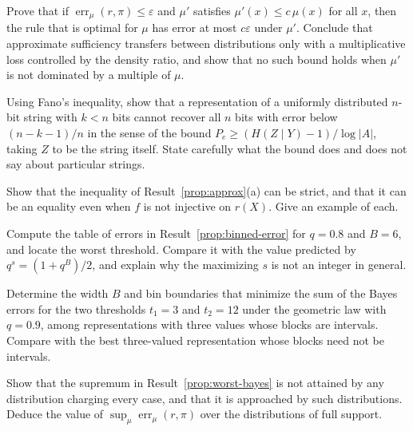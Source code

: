 \begin{exercise}
Prove that if $\operatorname{err}_\mu(r,\pi)\le\varepsilon$ and $\mu'$ satisfies $\mu'(x)\le c\,\mu(x)$ for all $x$, then the rule that is optimal for $\mu$ has error at most $c\varepsilon$ under $\mu'$. Conclude that approximate sufficiency transfers between distributions only with a multiplicative loss controlled by the density ratio, and show that no such bound holds when $\mu'$ is not dominated by a multiple of $\mu$.
\end{exercise}

\begin{exercise}
Using Fano's inequality, show that a representation of a uniformly distributed $n$-bit string with $k<n$ bits cannot recover all $n$ bits with error below $(n-k-1)/n$ in the sense of the bound $P_e\ge(H(Z\mid Y)-1)/\log|A|$, taking $Z$ to be the string itself. State carefully what the bound does and does not say about particular strings.
\end{exercise}

\begin{exercise}
Show that the inequality of Result~\ref{prop:approx}(a) can be strict, and that it can be an equality even when $f$ is not injective on $r(X)$. Give an example of each.
\end{exercise}


\begin{exercise}
Compute the table of errors in Result~\ref{prop:binned-error} for $q=0.8$ and $B=6$, and locate the worst threshold. Compare it with the value predicted by $q^{s}=(1+q^{B})/2$, and explain why the maximizing $s$ is not an integer in general.\label{ex:binned-table}
\end{exercise}

\begin{exercise}
Determine the width $B$ and bin boundaries that minimize the sum of the Bayes errors for the two thresholds $t_1=3$ and $t_2=12$ under the geometric law with $q=0.9$, among representations with three values whose blocks are intervals. Compare with the best three-valued representation whose blocks need not be intervals.
\end{exercise}

\begin{exercise}
Show that the supremum in Result~\ref{prop:worst-bayes} is not attained by any distribution charging every case, and that it is approached by such distributions. Deduce the value of $\sup_\mu\operatorname{err}_\mu(r,\pi)$ over the distributions of full support.
\end{exercise}

